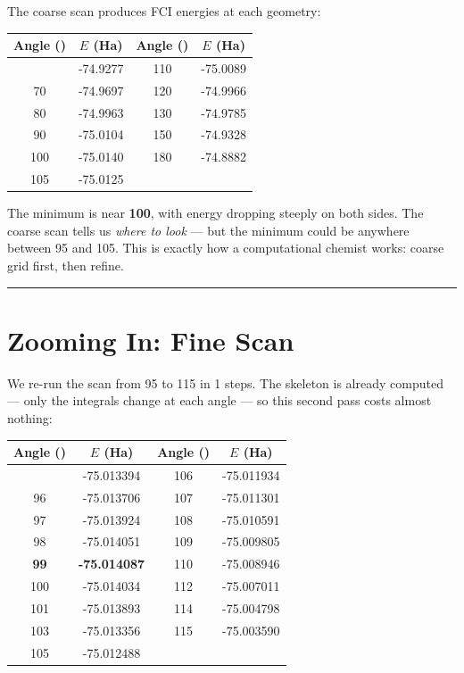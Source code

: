 \documentclass[
  11pt,
  oneside]{book}
\begin{document}
The coarse scan produces FCI energies at each geometry:

\begin{longtable}[]{@{}cccc@{}}
\toprule\noalign{}
Angle (\textdegree{}) & \(E\) (Ha) & Angle (\textdegree{}) & \(E\) (Ha) \\
\midrule\noalign{}
\endhead
\bottomrule\noalign{}
\endlastfoot
60 & -74.9277 & 110 & -75.0089 \\
70 & -74.9697 & 120 & -74.9966 \\
80 & -74.9963 & 130 & -74.9785 \\
90 & -75.0104 & 150 & -74.9328 \\
100 & -75.0140 & 180 & -74.8882 \\
105 & -75.0125 & & \\
\end{longtable}

The minimum is near \textbf{100\textdegree{}}, with energy dropping steeply on both
sides. The coarse scan tells us \emph{where to look} --- but the minimum
could be anywhere between 95\textdegree{} and 105\textdegree{}. This is exactly how a
computational chemist works: coarse grid first, then refine.

\begin{center}\rule{0.5\linewidth}{0.5pt}\end{center}

\section{Zooming In: Fine Scan}\label{zooming-in-fine-scan}

We re-run the scan from 95\textdegree{} to 115\textdegree{} in 1\textdegree{} steps. The skeleton is already
computed --- only the integrals change at each angle --- so this second
pass costs almost nothing:

\begin{longtable}[]{@{}cccc@{}}
\toprule\noalign{}
Angle (\textdegree{}) & \(E\) (Ha) & Angle (\textdegree{}) & \(E\) (Ha) \\
\midrule\noalign{}
\endhead
\bottomrule\noalign{}
\endlastfoot
95 & -75.013394 & 106 & -75.011934 \\
96 & -75.013706 & 107 & -75.011301 \\
97 & -75.013924 & 108 & -75.010591 \\
98 & -75.014051 & 109 & -75.009805 \\
\textbf{99} & \textbf{-75.014087} & 110 & -75.008946 \\
100 & -75.014034 & 112 & -75.007011 \\
101 & -75.013893 & 114 & -75.004798 \\
103 & -75.013356 & 115 & -75.003590 \\
105 & -75.012488 & & \\
\end{longtable}
\end{document}
